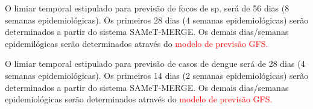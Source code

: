 \indent O limiar temporal estipulado para previsão de focos de  sp. será de 56 dias (8 semanas epidemiológicas). Os primeiros 28 dias (4 semanas epidemiológicas) serão determinados a partir do sistema \acrshort{SAMeT}-\acrshort{MERGE}. Os demais dias/semanas epidemilógicas serão determinados através do \textcolor{red}{modelo de previsão \acrshort{GFS}.}

\indent O limiar temporal estipulado para previsão de casos de dengue será de 28 dias (4 semanas epidemiológicas). Os primeiros 14 dias (2 semanas epidemiológicas) serão determinados a partir do sistema \acrshort{SAMeT}-\acrshort{MERGE}. Os demais dias/semanas epidemiológicas serão determinados através do \textcolor{red}{modelo de previsão \acrshort{GFS}.}











